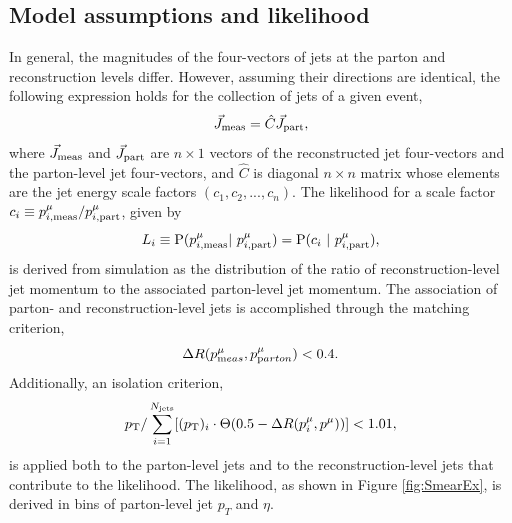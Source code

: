 \subsection{Model assumptions and likelihood} 
In general, the magnitudes of the four-vectors of jets at the parton and reconstruction levels differ. However, assuming their directions are identical, the following expression holds for the collection of jets of a given event,
\begin{equation}
\vec{J}_{\rm meas} = \hat{C} \vec{J}_{\rm part},
\end{equation}
where $\vec{J}_{\rm meas}$ and $\vec{J}_{\rm part}$ are $n\times 1$ vectors of the reconstructed jet four-vectors and the parton-level jet four-vectors, and $\hat{C}$ is diagonal $n\times n$ matrix whose elements are the jet energy scale factors $(c_1,c_2,...,c_n)$. The likelihood for a scale factor $c_i\equiv p^{\mu}_{i,\rm meas}/p^{\mu}_{i,\rm part}$, given by
\begin{equation}
L_{i}\equiv{\rm P}(p^{\mu}_{i,\rm meas}|\ p^{\mu}_{i,\rm part})={\rm P}(c_i\ |\ p^{\mu}_{i,\rm part}),
\label{eq:JetEnergyLikelihood}
\end{equation}
is derived from simulation as the distribution of the ratio of reconstruction-level jet momentum to the associated parton-level jet momentum. The association of parton- and reconstruction-level jets is accomplished through the matching criterion,
\begin{equation}
\Delta R(p^{\mu}_{\textrm meas},p^{\mu}_{\textrm parton})<0.4.
\end{equation}	
Additionally, an isolation criterion,
\begin{equation}
p_{\rm T}/\sum_{i=1}^{N_{\rm jets}}[(p_{\rm T})_{i}\cdot\Theta(0.5-\Delta R(p^{\mu}_{i},p^{\mu}))]<1.01,
\end{equation}
is applied both to the parton-level jets and to the reconstruction-level jets that contribute to the likelihood. The likelihood, as shown in Figure \ref{fig:SmearEx}, is derived in bins of parton-level jet $p_T$ and $\eta$.
